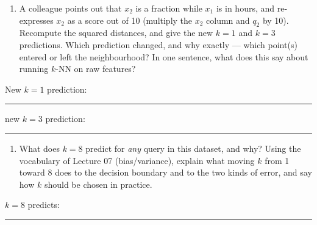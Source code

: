\documentclass[
  11pt,
]{article}
\providecommand{\tightlist}{%
  \setlength{\itemsep}{0pt}\setlength{\parskip}{0pt}}
\newcommand{\answerspace}[1]{\par\vspace*{#1}}  %
\newcommand{\blank}[1][1.2in]{\rule{#1}{0.4pt}}
\newcommand{\answerpage}{\clearpage}
\begin{document}
\answerspace{1.5in}

\begin{enumerate}
\def\labelenumi{(\alph{enumi})}
\setcounter{enumi}{1}
\tightlist
\item
  A colleague points out that \(x_2\) is a fraction while \(x_1\) is in
  hours, and re-expresses \(x_2\) as a score out of 10 (multiply the
  \(x_2\) column and \(q_2\) by 10). Recompute the squared distances,
  and give the new \(k = 1\) and \(k = 3\) predictions. Which prediction
  changed, and why exactly --- which point(s) entered or left the
  neighbourhood? In one sentence, what does this say about running
  \(k\)-NN on raw features?
\end{enumerate}

New \(k = 1\) prediction: \blank[0.8in]\quad new \(k = 3\) prediction:
\blank[0.8in]

\answerspace{2.8in}
\answerpage

\begin{enumerate}
\def\labelenumi{(\alph{enumi})}
\setcounter{enumi}{2}
\tightlist
\item
  What does \(k = 8\) predict for \emph{any} query in this dataset, and
  why? Using the vocabulary of Lecture 07 (bias/variance), explain what
  moving \(k\) from 1 toward 8 does to the decision boundary and to the
  two kinds of error, and say how \(k\) should be chosen in practice.
\end{enumerate}

\(k = 8\) predicts: \blank[1.2in]

\answerspace{2in}
\end{document}
